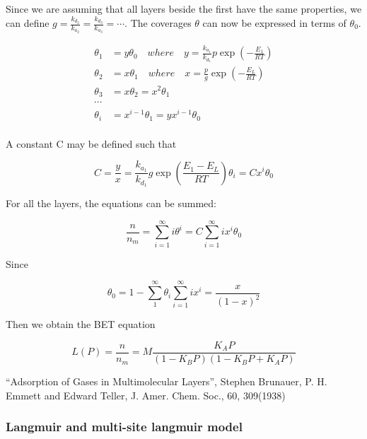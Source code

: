 Since we are assuming that all layers beside the first have the same properties,
we can define \(g= \frac{k_{d_2}}{k_{a_2}} = \frac{k_{d_3}}{k_{a_3}} = \cdots\).
The coverages \(\theta\) can now be expressed in terms of \(\theta_0\).

\begin{align}
    \theta_1 &= y \theta_0 \quad where \quad y = \frac{k_{a_1}}{k_{d_1}} p \exp{(-\frac{E_1}{RT})} \\
    \theta_2 &= x \theta_1 \quad where \quad x = \frac{p}{g} \exp{(-\frac{E_L}{RT})} \\
    \theta_3 &= x \theta_2 = x^2 \theta_1 \\
    \cdots \\
    \theta_i &= x^{i-1} \theta_1 = y x^{i-1} \theta_0 \\
\end{align}

A constant C may be defined such that

\begin{equation}
    C = \frac{y}{x} = \frac{k_{a_1}}{k_{d_1}} g \exp{(\frac{E_1 - E_L}{RT})}
    \theta_i = C x^i \theta_0
\end{equation}

For all the layers, the equations can be summed:

\begin{equation}
    \frac{n}{n_m} = \sum_{i=1}^{\infty} i \theta^i = C \sum_{i=1}^{\infty} i x^i \theta_0
\end{equation}

Since

\begin{equation}
    \theta_0 = 1 - \sum_{1}^{\infty} \theta_i
    \sum_{i=1}^{\infty} i x^i = \frac{x}{(1-x)^2}
\end{equation}

Then we obtain the BET equation

\begin{equation}
    L(P) = \frac{n}{n_m} = M\frac{K_A P}{(1-K_B P)(1-K_B P+ K_A P)}
\end{equation}

“Adsorption of Gases in Multimolecular Layers”, Stephen Brunauer,
P. H. Emmett and Edward Teller, J. Amer. Chem. Soc., 60, 309(1938)

\subsubsection{Langmuir and multi-site langmuir model}

